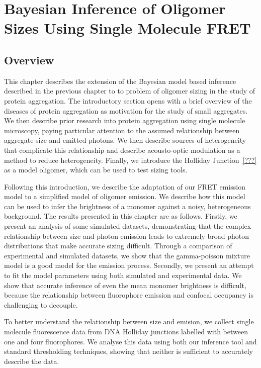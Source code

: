 \chapter{Bayesian Inference of Oligomer Sizes Using Single Molecule FRET}

\section{Overview}
This chapter describes the extension of the Bayesian model based inference described in the previous chapter to to problem of oligomer sizing in the study of protein aggregation. The introductory section opens with a brief overview of the diseases of protein aggregation as motivation for the study of small aggregates. We then describe prior research into protein aggregation using single molecule microscopy, paying particular attention to the assumed relationship between aggregate size and emitted photons. We then describe sources of heterogeneity that complicate this relationship and describe acousto-optic modulation as a method to reduce heterogeneity. Finally, we introduce the Holliday Junction~\ref{???} as a model oligomer, which can be used to test sizing tools.

Following this introduction, we describe the adaptation of our FRET emission model to a simplified model of oligomer emission. We describe how this model can be used to infer the brightness of a monomer against a noisy, heterogeneous background. The results presented in this chapter are as follows. Firstly, we present an analysis of some simulated datasets, demonstrating that the complex relationship between size and photon emission leads to extremely broad photon distributions that make accurate sizing difficult. Through a comparison of experimental and simulated datasets, we show that the gamma-poisson mixture model is a good model for the emission process. Secondly, we present an attempt to fit the model parameters using both simulated and experimental data. We show that accurate inference of even the mean monomer brightness is difficult, because the relationship between fluorophore emission and confocal occupancy is challenging to decouple. 

To better understand the relationship between size and emision, we collect single molecule fluorescence data from DNA Holliday junctions labelled with between one and four fluorophores. We analyse this data using both our inference tool and standard thresholding techniques, showing that neither is sufficient to accurately describe the data.

